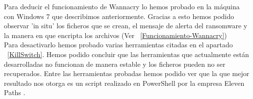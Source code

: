 Para deducir el funcionamiento de Wannacry lo hemos probado en la máquina con Windows 7 que describimos anteriormente. Gracias a esto hemos podido observar 'in situ' los ficheros que se crean, el mensaje de alerta del ransomware y la manera en que encripta los archivos (Ver ~\ref{Funcionamiento-Wannacry})\\
Para desactivarlo hemos probado varias herramientas citadas en el apartado ~\ref{KillSwitch}. Hemos podido concluir que las herramientas que actualmente están desarrolladas no funcionan de manera estable y los ficheros pueden no ser recuperados. Entre las herramientas probadas hemos podido ver que la que mejor resultado nos otorga es un script realizado en PowerShell por la empresa Eleven Paths \cite{killswitch-situacion-5}.